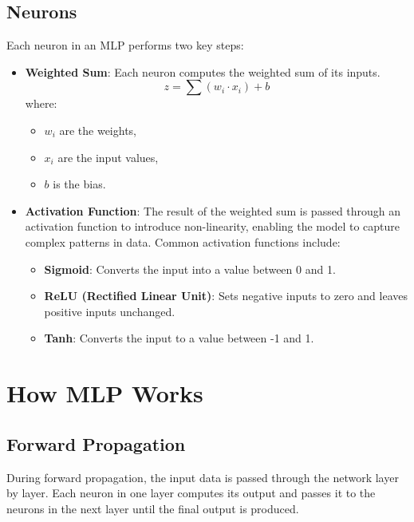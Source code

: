 \documentclass{article}
\begin{document}
	\subsection{Neurons}
	Each neuron in an MLP performs two key steps:
	\begin{itemize}
		\item \textbf{Weighted Sum}: Each neuron computes the weighted sum of its inputs.
		\begin{equation}
			z = \sum (w_i \cdot x_i) + b
		\end{equation}
		where:
		\begin{itemize}
			\item \( w_i \) are the weights,
			\item \( x_i \) are the input values,
			\item \( b \) is the bias.
		\end{itemize}
		\item \textbf{Activation Function}: The result of the weighted sum is passed through an activation function to introduce non-linearity, enabling the model to capture complex patterns in data. Common activation functions include:
		\begin{itemize}
			\item \textbf{Sigmoid}: Converts the input into a value between 0 and 1.
			\item \textbf{ReLU (Rectified Linear Unit)}: Sets negative inputs to zero and leaves positive inputs unchanged.
			\item \textbf{Tanh}: Converts the input to a value between -1 and 1.
		\end{itemize}
	\end{itemize}
	
	\section{How MLP Works}
	
	\subsection{Forward Propagation}
	During forward propagation, the input data is passed through the network layer by layer. Each neuron in one layer computes its output and passes it to the neurons in the next layer until the final output is produced.
	
\end{document}
